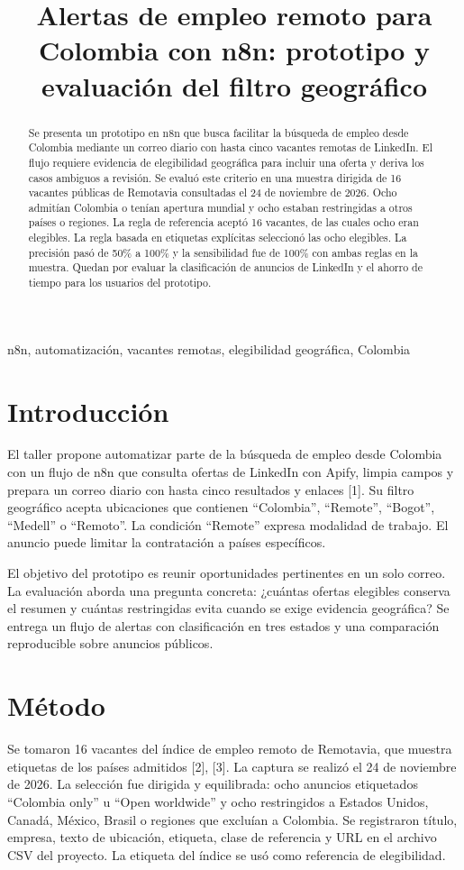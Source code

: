 \documentclass[conference]{IEEEtran}
\title{Alertas de empleo remoto para Colombia con n8n: prototipo y evaluación del filtro geográfico}
\author{\IEEEauthorblockN{Andrés Daniel Medina Erazo}
\IEEEauthorblockA{Universidad del Cauca\\
Popayán, Colombia}}
\begin{document}
\maketitle

\begin{abstract}
Se presenta un prototipo en n8n que busca facilitar la búsqueda de empleo desde Colombia mediante un correo diario con hasta cinco vacantes remotas de LinkedIn. El flujo requiere evidencia de elegibilidad geográfica para incluir una oferta y deriva los casos ambiguos a revisión. Se evaluó este criterio en una muestra dirigida de 16 vacantes públicas de Remotavia consultadas el 24 de noviembre de 2026. Ocho admitían Colombia o tenían apertura mundial y ocho estaban restringidas a otros países o regiones. La regla de referencia aceptó 16 vacantes, de las cuales ocho eran elegibles. La regla basada en etiquetas explícitas seleccionó las ocho elegibles. La precisión pasó de 50\% a 100\% y la sensibilidad fue de 100\% con ambas reglas en la muestra. Quedan por evaluar la clasificación de anuncios de LinkedIn y el ahorro de tiempo para los usuarios del prototipo.
\end{abstract}

\begin{IEEEkeywords}
n8n, automatización, vacantes remotas, elegibilidad geográfica, Colombia
\end{IEEEkeywords}

\section{Introducción}
El taller propone automatizar parte de la búsqueda de empleo desde Colombia con un flujo de n8n que consulta ofertas de LinkedIn con Apify, limpia campos y prepara un correo diario con hasta cinco resultados y enlaces [1]. Su filtro geográfico acepta ubicaciones que contienen ``Colombia'', ``Remote'', ``Bogot'', ``Medell'' o ``Remoto''. La condición ``Remote'' expresa modalidad de trabajo. El anuncio puede limitar la contratación a países específicos.

El objetivo del prototipo es reunir oportunidades pertinentes en un solo correo. La evaluación aborda una pregunta concreta: ¿cuántas ofertas elegibles conserva el resumen y cuántas restringidas evita cuando se exige evidencia geográfica? Se entrega un flujo de alertas con clasificación en tres estados y una comparación reproducible sobre anuncios públicos.

\section{Método}
Se tomaron 16 vacantes del índice de empleo remoto de Remotavia, que muestra etiquetas de los países admitidos [2], [3]. La captura se realizó el 24 de noviembre de 2026. La selección fue dirigida y equilibrada: ocho anuncios etiquetados ``Colombia only'' u ``Open worldwide'' y ocho restringidos a Estados Unidos, Canadá, México, Brasil o regiones que excluían a Colombia. Se registraron título, empresa, texto de ubicación, etiqueta, clase de referencia y URL en el archivo CSV del proyecto. La etiqueta del índice se usó como referencia de elegibilidad.
\end{document}

